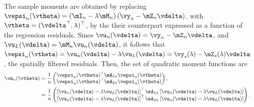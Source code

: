 \documentclass[english,12pt]{book}\usepackage[]{graphicx}\usepackage[]{xcolor}
\begin{document}

The sample moments are obtained by replacing $\vepsi_n(\vtheta) = \left(\mI_n - \lambda\mM_n\right)\left(\vy_n - \mZ_n\vdelta\right)$, with $\vtheta = (\vdelta^\top, \lambda)^\top$, by the their counterpart expressed as a function of the regression residuals. Since $\vu_n(\vdelta) = \vy_n - \mZ_n\vdelta$, and $\vu_L(\vdelta) = \mM_n\vu_n(\vdelta)$, it follows that $\vepsi_n(\vtheta) = \vu_n(\vdelta) - \lambda \vu_L(\vdelta) = \vy_{s}(\lambda) - \mZ_s(\lambda)\vdelta$, the spatially filtered residuals. Then, the set of quadratic moment functions are
\begin{equation}\label{eq:moment_conditions_reduced_u}
\begin{aligned}
\vm_n(\vtheta) & = \frac{1}{n}\begin{pmatrix}
\vepsi_n(\vtheta)^\top\mA_{1n}\vepsi_n(\vtheta) \\
\vepsi_n(\vtheta)^\top\mA_{2n}\vepsi_n(\vtheta)
                              \end{pmatrix}, \\
              & = \frac{1}{n}\begin{pmatrix}
              \left[\vu_n(\vdelta) - \lambda \vu_L(\vdelta)\right]^\top \mA_{1n} \left[\vu_n(\vdelta) - \lambda \vu_L(\vdelta)\right] \\
              \left[\vu_n(\vdelta) - \lambda \vu_L(\vdelta)\right]^\top \mA_{2n} \left[\vu_n(\vdelta) - \lambda \vu_L(\vdelta)\right]
                 \end{pmatrix}.
\end{aligned}
\end{equation}
\end{document}
